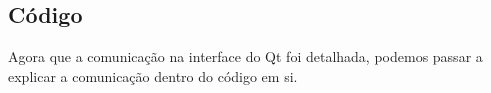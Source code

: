 \subsection{Código}

Agora que a comunicação na interface do Qt foi detalhada,
podemos passar a explicar a comunicação dentro do código em si.

